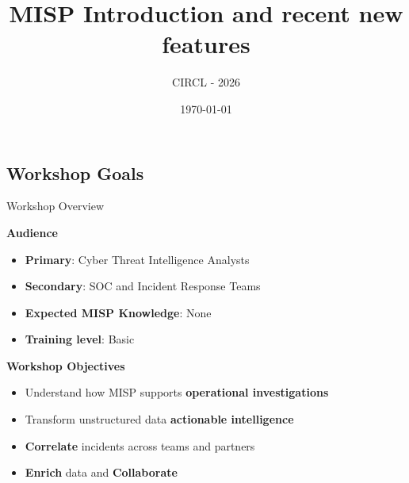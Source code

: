 \documentclass[10pt,aspectratio=169, colorlinks=true, linkcolor=circlBlue]{beamer}
\title{MISP Introduction and recent new features}
\subtitle{CIRCL - 2026}
\date{\today}
\author{}
\institute{MISP Project \normalurl{https://misp-project.org}}
\begin{document}






\begin{frame}[t,plain]
	\titlepage%
\end{frame}




\subsection{Workshop Goals}

\begin{frame}{Workshop Overview}

\textbf{Audience}
\vspace{-0.5em}
\begin{itemize}
    \item \textbf{Primary}: Cyber Threat Intelligence Analysts
    \item \textbf{Secondary}: SOC and Incident Response Teams
    \item \textbf{Expected MISP Knowledge}: None
    \item \textbf{Training level}: Basic
\end{itemize}


\textbf{Workshop Objectives}
\vspace{-0.5em}
\begin{itemize}
    \item Understand how MISP supports \textbf{operational investigations}
    \item Transform unstructured data \textbf{actionable intelligence}
    \item \textbf{Correlate} incidents across teams and partners
    \item \textbf{Enrich} data and \textbf{Collaborate}
\end{itemize}

\end{frame}
\end{document}
